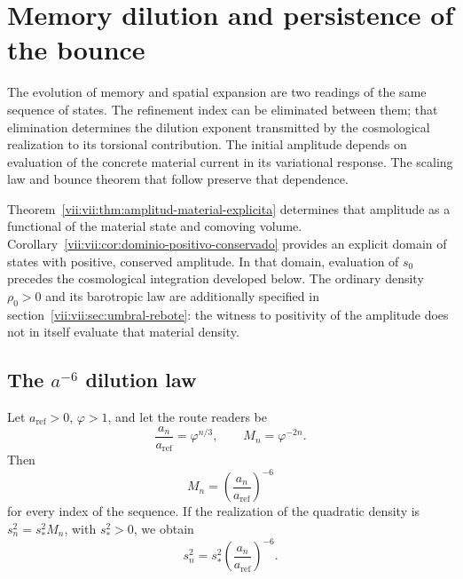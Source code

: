 
\section{Memory dilution and persistence of the bounce}
\label{vii:vii:sec:dilucion-rebote}

The evolution of memory and spatial expansion are two readings of
the same sequence of states. The refinement index can be eliminated
between them; that elimination determines the dilution exponent transmitted
by the cosmological realization to its torsional contribution.
The initial amplitude depends on evaluation of the concrete material
current in its variational response. The scaling law and bounce
theorem that follow preserve that dependence.

Theorem~\ref{vii:vii:thm:amplitud-material-explicita} determines that
amplitude as a functional of the material state and comoving volume.
Corollary~\ref{vii:vii:cor:dominio-positivo-conservado} provides
an explicit domain of states with positive, conserved amplitude.
In that domain, evaluation of \(s_0\) precedes the cosmological
integration developed below. The ordinary density
\(\rho_0>0\) and its barotropic law are additionally specified in
section~\ref{vii:vii:sec:umbral-rebote}: the witness to positivity of the
amplitude does not in itself evaluate that material density.

\subsection{The \(a^{-6}\) dilution law}
\label{vii:vii:sec:dilucion}

\begin{proposition}
\label{vii:vii:prop:dilucion}
Let \(a_{\mathrm{ref}}>0\), \(\varphi>1\), and let the route readers be
\[
 \frac{a_n}{a_{\mathrm{ref}}}=\varphi^{n/3},\qquad
 M_n=\varphi^{-2n}.
\]
Then
\[
 M_n=\left(\frac{a_n}{a_{\mathrm{ref}}}\right)^{-6}
\]
for every index of the sequence. If the realization of the quadratic
density is \(s_n^2=s_*^2M_n\), with \(s_*^2>0\), we obtain
\[
 s_n^2=s_*^2\left(\frac{a_n}{a_{\mathrm{ref}}}\right)^{-6}.
\]
\end{proposition}

